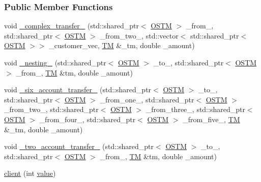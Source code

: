 \subsubsection*{Public Member Functions}
\begin{DoxyCompactItemize}
\item 
void \hyperlink{classclient_a3c5e378b6df49d2d2eea4a073da5a594_a3c5e378b6df49d2d2eea4a073da5a594}{\+\_\+complex\+\_\+transfer\+\_\+} (std\+::shared\+\_\+ptr$<$ \hyperlink{class_o_s_t_m}{O\+S\+TM} $>$ \+\_\+from\+\_\+, std\+::shared\+\_\+ptr$<$ \hyperlink{class_o_s_t_m}{O\+S\+TM} $>$ \+\_\+from\+\_\+two\+\_\+, std\+::vector$<$ std\+::shared\+\_\+ptr$<$ \hyperlink{class_o_s_t_m}{O\+S\+TM} $>$$>$ \+\_\+customer\+\_\+vec, \hyperlink{class_t_m}{TM} \&\+\_\+tm, double \+\_\+amount)
\item 
void \hyperlink{classclient_ac0ebebd379895869c22f8919ad3bd37f_ac0ebebd379895869c22f8919ad3bd37f}{\+\_\+nesting\+\_\+} (std\+::shared\+\_\+ptr$<$ \hyperlink{class_o_s_t_m}{O\+S\+TM} $>$ \+\_\+to\+\_\+, std\+::shared\+\_\+ptr$<$ \hyperlink{class_o_s_t_m}{O\+S\+TM} $>$ \+\_\+from\+\_\+, \hyperlink{class_t_m}{TM} \&tm, double \+\_\+amount)
\item 
void \hyperlink{classclient_a94fb0b42124860568a011ed94f8bc9d5_a94fb0b42124860568a011ed94f8bc9d5}{\+\_\+six\+\_\+account\+\_\+transfer\+\_\+} (std\+::shared\+\_\+ptr$<$ \hyperlink{class_o_s_t_m}{O\+S\+TM} $>$ \+\_\+to\+\_\+, std\+::shared\+\_\+ptr$<$ \hyperlink{class_o_s_t_m}{O\+S\+TM} $>$ \+\_\+from\+\_\+one\+\_\+, std\+::shared\+\_\+ptr$<$ \hyperlink{class_o_s_t_m}{O\+S\+TM} $>$ \+\_\+from\+\_\+two\+\_\+, std\+::shared\+\_\+ptr$<$ \hyperlink{class_o_s_t_m}{O\+S\+TM} $>$ \+\_\+from\+\_\+three\+\_\+, std\+::shared\+\_\+ptr$<$ \hyperlink{class_o_s_t_m}{O\+S\+TM} $>$ \+\_\+from\+\_\+four\+\_\+, std\+::shared\+\_\+ptr$<$ \hyperlink{class_o_s_t_m}{O\+S\+TM} $>$ \+\_\+from\+\_\+five\+\_\+, \hyperlink{class_t_m}{TM} \&\+\_\+tm, double \+\_\+amount)
\item 
void \hyperlink{classclient_a71edd1265ba9ae03f71b5dbf54548696_a71edd1265ba9ae03f71b5dbf54548696}{\+\_\+two\+\_\+account\+\_\+transfer\+\_\+} (std\+::shared\+\_\+ptr$<$ \hyperlink{class_o_s_t_m}{O\+S\+TM} $>$ \+\_\+to\+\_\+, std\+::shared\+\_\+ptr$<$ \hyperlink{class_o_s_t_m}{O\+S\+TM} $>$ \+\_\+from\+\_\+, \hyperlink{class_t_m}{TM} \&tm, double \+\_\+amount)
\item 
\hyperlink{classclient_a62e0309db8390260d05d8c3084c6fdd4_a62e0309db8390260d05d8c3084c6fdd4}{client} (int \hyperlink{classclient_a30e2070077d9ba875bfa6616a43d879c_a30e2070077d9ba875bfa6616a43d879c}{value})
\end{DoxyCompactItemize}
